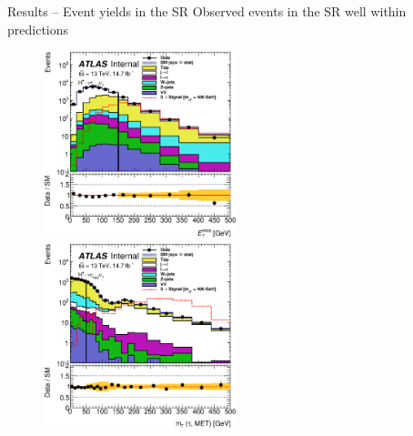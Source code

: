 \documentclass[10pt]{beamer}
\begin{document}
\begin{frame}{Results -- Event yields in the SR}
\centering
{\large\color{blue} Observed events in the SR well within predictions}
\begin{figure}
					 \includegraphics[width=0.5\textwidth]{figures/met_SR_nMinus1.eps}
   \includegraphics[width=0.5\textwidth]{figures/mT_SR_nMinus1.eps}
\end{figure}
\end{frame}
\end{document}

